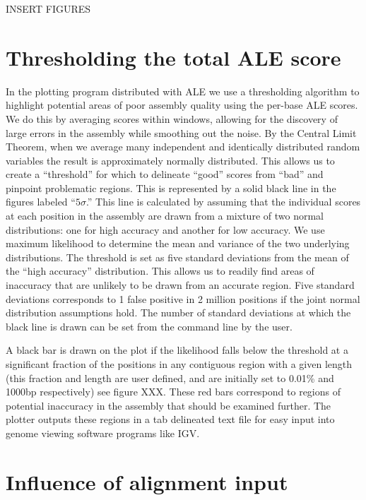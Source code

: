 \documentclass[phd,tocprelim]{cornell}
\begin{document}
INSERT FIGURES


\section{Thresholding the total ALE score} %
\label{sec:Thresholding the total ALE score}

In the plotting program distributed with ALE we use a thresholding algorithm to highlight potential areas of poor assembly quality using the per-base ALE scores. We do this by averaging scores within windows, allowing for the discovery of large errors in the assembly while smoothing out the noise. By the Central Limit Theorem, when we average many independent and identically distributed random variables the result is approximately normally distributed. This allows us to create a “threshold” for which to delineate “good” scores from “bad” and pinpoint problematic regions. This is represented by a solid black line in the figures labeled “$5\sigma$.” This line is calculated by assuming that the individual scores at each position in the assembly are drawn from a mixture of two normal distributions: one for high accuracy and another for low accuracy. We use maximum likelihood to determine the mean and variance of the two underlying distributions. The threshold is set as five standard deviations from the mean of the “high accuracy” distribution. This allows us to readily find areas of inaccuracy that are unlikely to be drawn from an accurate region. Five standard deviations corresponds to 1 false positive in 2 million positions if the joint normal distribution assumptions hold.  The number of standard deviations at which the black line is drawn can be set from the command line by the user.

A black bar is drawn on the plot if the likelihood falls below the threshold at a significant fraction of the positions in any contiguous region with a given length (this fraction and length are user defined, and are initially set to 0.01\% and 1000bp respectively) see figure XXX. These red bars correspond to regions of potential inaccuracy in the assembly that should be examined further. The plotter outputs these regions in a tab delineated text file for easy input into genome viewing software programs like IGV.


\section{Influence of alignment input} %
\label{sec:Influence of alignment input}
\end{document}
